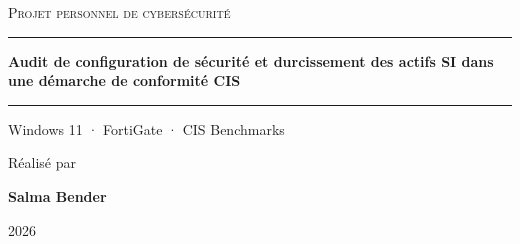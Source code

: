 \documentclass[11pt,a4paper,oneside]{report}
\begin{document}
\begin{titlepage}
\centering
\vspace*{3.2cm}
{\sffamily\large\color{accent2}\textsc{Projet personnel de cybersécurité}\par}
\vspace{1.2cm}
{\color{accent}\rule{0.7\textwidth}{1.2pt}\par}
\vspace{0.9cm}
{\sffamily\bfseries\huge\color{accent}Audit de configuration de sécurité et durcissement des actifs SI dans une démarche de conformité CIS\par}
\vspace{0.9cm}
{\color{accent}\rule{0.7\textwidth}{1.2pt}\par}
\vspace{1.4cm}
{\sffamily\large Windows 11 · FortiGate · CIS Benchmarks\par}
\vfill
{\large Réalisé par\par}
\vspace{0.2cm}
{\sffamily\Large\bfseries Salma Bender\par}
\vspace{1.2cm}
{\large 2026\par}
\end{titlepage}

\setcounter{tocdepth}{2}
\tableofcontents

\clearpage{}
\renewcommand{\listfigurename}{Liste des figures}
\listoffigures

\clearpage{}
{}
\listoftables



\clearpage
{}




\end{document}
